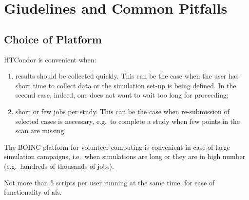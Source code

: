 \chapter{Giudelines and Common Pitfalls} \label{Guidelines}

\section{Choice of Platform}
HTCondor is convenient when:
\begin{enumerate}
\item results should be collected quickly. This can be the case when
  the user has short time to collect data or the simulation set-up
  is being defined. In the second case, indeed, one does not want to wait
  too long for proceeding;
\item short or few jobs per study. This can be the case when re-submission
  of selected cases is necessary, e.g.~to complete a study when few points
  in the scan are missing;
\end{enumerate}  

The BOINC platform for volunteer computing is convenient in case of
large simulation campaigns, i.e.~when simulations are long or they
are in high number (e.g.~hundreds of thousands of jobs).

Not more than 5 scripts per user running at the same time, for ease
of functionality of afs.
